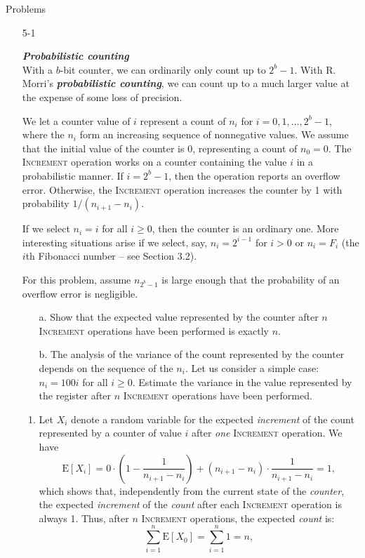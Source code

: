 \documentclass{report}
\makeatletter
\renewenvironment{framed}{%
 \def\FrameCommand##1{\hskip\@totalleftmargin
 \fboxsep=\FrameSep\fbox{##1}}%
 \MakeFramed {\advance\hsize-\width
   \@totalleftmargin\z@ \linewidth\hsize
   \@setminipage}}%
 {\par\unskip\endMakeFramed}
\makeatother
\begin{document}
\newpage

{\large Problems}

\begin{enumerate}
\item[5{-}1]{\textbf{\emph{Probabilistic counting}}\\
With a $b$-bit counter, we can ordinarily only count up to $2^b - 1$. With R.
Morri's \textbf{\emph{probabilistic counting}}, we can count up to a much larger
value at the expense of some loss of precision.

We let a counter value of $i$ represent a count of $n_i$ for
$i = 0, 1, \dots, 2^b - 1$, where the $n_i$ form an increasing sequence of
nonnegative values. We assume that the initial value of the counter is 0,
representing a count of $n_0 = 0$. The \textsc{Increment} operation works on
a counter containing the value $i$ in a probabilistic manner. If $i = 2^b - 1$,
then the operation reports an overflow error. Otherwise, the \textsc{Increment}
operation increases the counter by 1 with probability $1/(n_{i + 1} - n_i)$.

If we select $n_i = i$ for all $i \ge 0$, then the counter is an ordinary one.
More interesting situations arise if we select, say, $n_i = 2^{i - 1}$ for
$i > 0$ or $n_i = F_i$ (the $i$th Fibonacci number {--} see Section 3.2).

For this problem, assume $n_{2^b - 1}$ is large enough that the probability of
an overflow error is negligible.

\begin{enumerate}
\item[a.] Show that the expected value represented by the counter after $n$
\textsc{Increment} operations have been performed is exactly $n$.
\item[b.] The analysis of the variance of the count represented by the counter
depends on the sequence of the $n_i$. Let us consider a simple case:
$n_i = 100i$ for all $i \ge 0$. Estimate the variance in the value represented
by the register after $n$ \textsc{Increment} operations have been performed.
\end{enumerate}
}

\begin{framed}
\begin{enumerate}
\item
Let $X_i$ denote a random variable for the expected \emph{increment} of the
count represented by a counter of value $i$ after \emph{one} \textsc{Increment}
operation. We have
\[
  \text{E}[X_i] = 0 \cdot \left(1 - \frac{1}{n_{i + 1} - n_{i}}\right) + (n_{i + 1} - n_{i}) \cdot \frac{1}{n_{i + 1} - n_{i}} = 1,
\]
which shows that, independently from the current state of the \emph{counter},
the expected \emph{increment} of the \emph{count} after each \textsc{Increment}
operation is always 1. Thus, after $n$ \textsc{Increment} operations, the
expected \emph{count} is:
\[
  \sum_{i = 1}^{n} \text{E}[X_0] = \sum_{i = 1}^{n} 1 = n,
\]


\end{enumerate}
\end{framed}
\end{enumerate}
\end{document}
